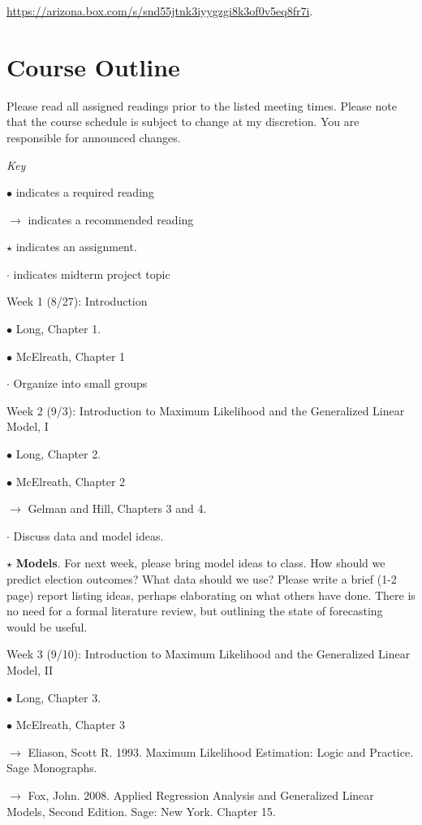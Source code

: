 \documentclass[
]{book}
\begin{document}
\url{https://arizona.box.com/s/snd55jtnk3iyygzgi8k3of0v5eq8fr7i}.

\section{Course Outline}\label{course-outline}

Please read all assigned readings prior to the listed meeting times. Please note that the course schedule is subject to change at my discretion. You are responsible for announced changes.

\emph{Key}

\(\bullet\) indicates a required reading

\(\rightarrow\) indicates a recommended reading

\(\star\) indicates an assignment.

\(\cdot\) indicates midterm project topic

Week 1 (8/27): Introduction

\(\bullet\) Long, Chapter 1.

\(\bullet\) McElreath, Chapter 1

\(\cdot\) Organize into small groups

Week 2 (9/3): Introduction to Maximum Likelihood and the Generalized Linear Model, I

\(\bullet\) Long, Chapter 2.

\(\bullet\) McElreath, Chapter 2

\(\rightarrow\) Gelman and Hill, Chapters 3 and 4.

\(\cdot\) Discuss data and model ideas.

\(\star\) \textbf{Models}. For next week, please bring model ideas to class. How should we predict election outcomes? What data should we use? Please write a brief (1-2 page) report listing ideas, perhaps elaborating on what others have done. There is no need for a formal literature review, but outlining the state of forecasting would be useful.

Week 3 (9/10): Introduction to Maximum Likelihood and the Generalized Linear Model, II

\(\bullet\) Long, Chapter 3.

\(\bullet\) McElreath, Chapter 3

\(\rightarrow\) Eliason, Scott R. 1993. Maximum Likelihood Estimation: Logic and Practice. Sage Monographs.

\(\rightarrow\) Fox, John. 2008. Applied Regression Analysis and Generalized Linear Models, Second Edition. Sage: New York. Chapter 15.
\end{document}
